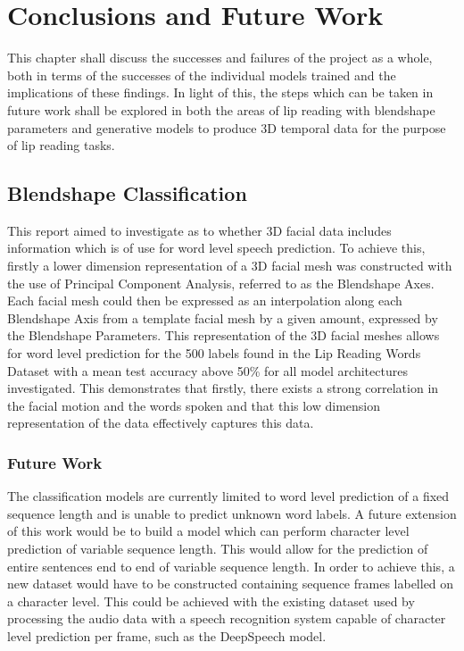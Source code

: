 \chapter{Conclusions and Future Work}

This chapter shall discuss the successes and failures of the project as a whole, both in terms of the successes of the individual models trained and the implications of these findings.
In light of this, the steps which can be taken in future work shall be explored in both the areas of lip reading with blendshape parameters and generative models to produce 3D temporal data for the purpose of lip reading tasks.

\section{Blendshape Classification}\label{sec:class_conc}
This report aimed to investigate as to whether 3D facial data includes information which is of use for word level speech prediction.
To achieve this, firstly a lower dimension representation of a 3D facial mesh was constructed with the use of Principal Component Analysis, referred to as the Blendshape Axes.
Each facial mesh could then be expressed as an interpolation along each Blendshape Axis from a template facial mesh by a given amount, expressed by the Blendshape Parameters.
This representation of the 3D facial meshes allows for word level prediction for the 500 labels found in the Lip Reading Words Dataset with a mean test accuracy above 50\% for all model architectures investigated.
This demonstrates that firstly, there exists a strong correlation in the facial motion and the words spoken and that this low dimension representation of the data effectively captures this data.

\subsection{Future Work}
The classification models are currently limited to word level prediction of a fixed sequence length and is unable to predict unknown word labels.
A future extension of this work would be to build a model which can perform character level prediction of variable sequence length.
This would allow for the prediction of entire sentences end to end of variable sequence length.
In order to achieve this, a new dataset would have to be constructed containing sequence frames labelled on a character level.
This could be achieved with the existing dataset used by processing the audio data with a speech recognition system capable of character level prediction per frame, such as the DeepSpeech model.

